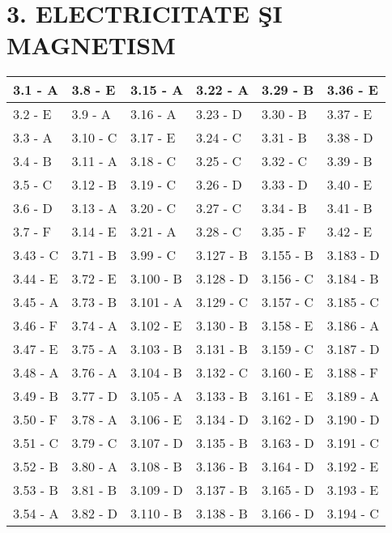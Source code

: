 
\section*{3. ELECTRICITATE ŞI MAGNETISM}
\begin{center}
\begin{tabular}{|l|l|l|l|l|l|}
\hline
3.1 - A & 3.8 - E & 3.15 - A & 3.22 - A & 3.29 - B & 3.36 - E \\
\hline
3.2 - E & 3.9 - A & 3.16 - A & 3.23 - D & 3.30 - B & 3.37 - E \\
\hline
3.3 - A & 3.10 - C & 3.17 - E & 3.24 - C & 3.31 - B & 3.38 - D \\
\hline
3.4 - B & 3.11 - A & 3.18 - C & 3.25 - C & 3.32 - C & 3.39 - B \\
\hline
3.5 - C & 3.12 - B & 3.19 - C & 3.26 - D & 3.33 - D & 3.40 - E \\
\hline
3.6 - D & 3.13 - A & 3.20 - C & 3.27 - C & 3.34 - B & 3.41 - B \\
\hline
3.7 - F & 3.14 - E & 3.21 - A & 3.28 - C & 3.35 - F & 3.42 - E \\
\hline
3.43 - C & 3.71 - B & 3.99 - C & 3.127 - B & 3.155 - B & 3.183 - D \\
\hline
3.44 - E & 3.72 - E & 3.100 - B & 3.128 - D & 3.156 - C & 3.184 - B \\
\hline
3.45 - A & 3.73 - B & 3.101 - A & 3.129 - C & 3.157 - C & 3.185 - C \\
\hline
3.46 - F & 3.74 - A & 3.102 - E & 3.130 - B & 3.158 - E & 3.186 - A \\
\hline
3.47 - E & 3.75 - A & 3.103 - B & 3.131 - B & 3.159 - C & 3.187 - D \\
\hline
3.48 - A & 3.76 - A & 3.104 - B & 3.132 - C & 3.160 - E & 3.188 - F \\
\hline
3.49 - B & 3.77 - D & 3.105 - A & 3.133 - B & 3.161 - E & 3.189 - A \\
\hline
3.50 - F & 3.78 - A & 3.106 - E & 3.134 - D & 3.162 - D & 3.190 - D \\
\hline
3.51 - C & 3.79 - C & 3.107 - D & 3.135 - B & 3.163 - D & 3.191 - C \\
\hline
3.52 - B & 3.80 - A & 3.108 - B & 3.136 - B & 3.164 - D & 3.192 - E \\
\hline
3.53 - B & 3.81 - B & 3.109 - D & 3.137 - B & 3.165 - D & 3.193 - E \\
\hline
3.54 - A & 3.82 - D & 3.110 - B & 3.138 - B & 3.166 - D & 3.194 - C \\

\end{tabular}
\end{center}

